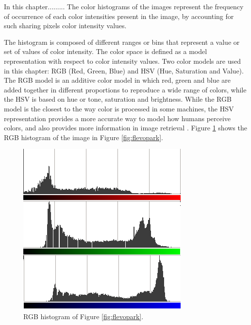
In this chapter.........
The color histograms of 
the images represent the frequency of occurrence of each color
intensities present in the image, by accounting for such sharing
pixels color intensity values. %

The histogram is composed of different ranges or bins that represent a value or set of values of color intensity. %
 The color space is defined as a model representation with respect to color intensity values. Two color models are used in this chapter: RGB (Red, Green, Blue) and HSV (Hue, Saturation and Value). The RGB model is an additive color model in which red, green and blue are added together in different proportions to reproduce a wide range of colors, while the HSV is based on hue or tone, saturation and brightness. While the RGB model is the closest to the way color is processed in some machines, the HSV representation provides a more accurate way to model how humans perceive colors, and also provides more information in image retrieval \cite{COLORDIFFERENCES}.
Figure \ref{fig:histogram} shows the RGB histogram of the image in Figure \ref{fig:flevopark}.

\begin{figure}
\centering
   \includegraphics[scale =0.6] {gfx/art/histogram.png}
\caption{RGB histogram of Figure \ref{fig:flevopark}. }
\label{fig:histogram}
\end{figure}

